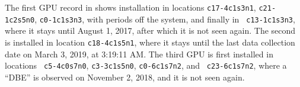 \begin{figure}
\begin{minipage}{0.49\columnwidth}
  \end{minipage}
  \caption{}
  \label{fig:layout}
\end{figure}


The first GPU record in 
shows installation in locations {\tt c17-4c1s3n1}, {\tt c21-1c2s5n0},
{\tt c0-1c1s3n3}, with periods off the system, and finally in {\tt
  c13-1c1s3n3}, where it stays until August 1, 2017, after which it is
not seen again. The second is installed in location {\tt c18-4c1s5n1},
where it stays until the last data collection date on March 3, 2019,
at 3:19:11 AM. The third GPU is first installed in locations {\tt
  c5-4c0s7n0}, {\tt c3-3c1s5n0}, {\tt c0-6c1s7n2}, and {\tt
  c23-6c1s7n2}, where a ``DBE'' is observed on November 2, 2018, and
it is not seen again.



